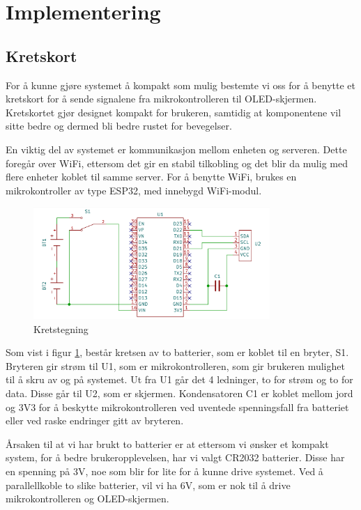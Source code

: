 
\section{Implementering}
\label{sec:implementering}

\subsection{Kretskort}

For å kunne gjøre systemet å kompakt som mulig bestemte vi oss for å benytte et kretskort for å sende signalene fra mikrokontrolleren til OLED-skjermen. Kretskortet gjør designet kompakt for brukeren, samtidig at komponentene vil sitte bedre og dermed bli bedre rustet for bevegelser. 

En viktig del av systemet er kommunikasjon mellom enheten og serveren. Dette foregår over WiFi, ettersom det gir en stabil tilkobling og det blir da mulig med flere enheter koblet til samme server. For å benytte WiFi, brukes en mikrokontroller av type ESP32, med innebygd WiFi-modul. 

\begin{figure}[H]
    \centering
    \includegraphics[width=0.8\textwidth]{rapport/Images/implementering/Kretskort tegning.png}
    \caption{Kretstegning}
    \label{fig:kretskort-kretstegning}
\end{figure}

Som vist i figur \ref{fig:kretskort-kretstegning}, består kretsen av to batterier, som er koblet til en bryter, S1. Bryteren gir strøm til U1, som er mikrokontrolleren, som gir brukeren mulighet til å skru av og på systemet. Ut fra U1 går det 4 ledninger, to for strøm og to for data. Disse går til U2, som er skjermen. Kondensatoren C1 er koblet mellom jord og 3V3 for å beskytte mikrokontrolleren ved uventede spenningsfall fra batteriet eller ved raske endringer gitt av bryteren.

Årsaken til at vi har brukt to batterier er at ettersom vi ønsker et kompakt system, for å bedre brukeropplevelsen, har vi valgt CR2032 batterier. Disse har en spenning på 3V, noe som blir for lite for å kunne drive systemet. Ved å parallellkoble to slike batterier, vil vi ha 6V, som er nok til å drive mikrokontrolleren og OLED-skjermen. 

